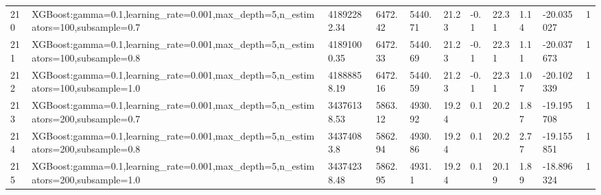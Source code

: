 \begin{longtable}{C{0.8cm} L{2cm} C{1.15cm} C{1.15cm} C{1.15cm} C{1.15cm} C{0.85cm} C{1.25cm} C{1.2cm} C{1.5cm} C{1.0cm}}
210 & XGBoost:\newline gamma=0.1,\newline learning\_rate=0.001,\newline max\_depth=5,\newline n\_estimators=100,\newline subsample=0.7 & 41892282.34 & 6472.42 & 5440.71 & 21.23 & -0.1 & 22.31 & 1.14 & -20.035027 & 1 \\
211 & XGBoost:\newline gamma=0.1,\newline learning\_rate=0.001,\newline max\_depth=5,\newline n\_estimators=100,\newline subsample=0.8 & 41891000.35 & 6472.33 & 5440.69 & 21.23 & -0.1 & 22.31 & 1.11 & -20.037673 & 1 \\
212 & XGBoost:\newline gamma=0.1,\newline learning\_rate=0.001,\newline max\_depth=5,\newline n\_estimators=100,\newline subsample=1.0 & 41888858.19 & 6472.16 & 5440.59 & 21.23 & -0.1 & 22.31 & 1.07 & -20.102339 & 1 \\
213 & XGBoost:\newline gamma=0.1,\newline learning\_rate=0.001,\newline max\_depth=5,\newline n\_estimators=200,\newline subsample=0.7 & 34376138.53 & 5863.12 & 4930.92 & 19.24 & 0.1 & 20.2 & 1.87 & -19.195708 & 1 \\
214 & XGBoost:\newline gamma=0.1,\newline learning\_rate=0.001,\newline max\_depth=5,\newline n\_estimators=200,\newline subsample=0.8 & 34374083.8 & 5862.94 & 4930.86 & 19.24 & 0.1 & 20.2 & 2.77 & -19.155851 & 1 \\
215 & XGBoost:\newline gamma=0.1,\newline learning\_rate=0.001,\newline max\_depth=5,\newline n\_estimators=200,\newline subsample=1.0 & 34374238.48 & 5862.95 & 4931.1 & 19.24 & 0.1 & 20.19 & 1.89 & -18.896324 & 1 \\

\end{longtable}
